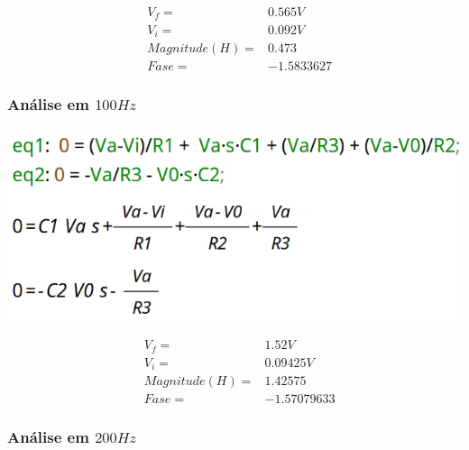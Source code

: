 \documentclass[12pt,twoside, a4paper, twocolumn]{article}
\begin{document}
\begin{equation*}
    \begin{aligned}
         & V_f =          & 0.565V     \\
         & V_i =          & 0.092V     \\
         & Magnitude(H) = & 0.473      \\
         & Fase =         & -1.5833627
    \end{aligned}
\end{equation*}








\subsubsection{Análise em $100Hz$}
\subparagraph*{}




\begin{adjustbox}{scale=0.18}
    \includegraphics{eqs.png}
\end{adjustbox}




\begin{equation*}
    \begin{aligned}
         & V_f =          & 1.52V       \\
         & V_i =          & 0.09425V    \\
         & Magnitude(H) = & 1.42575     \\
         & Fase =         & -1.57079633
    \end{aligned}
\end{equation*}




\subsubsection{Análise em $200Hz$}
\subparagraph*{}
\end{document}
